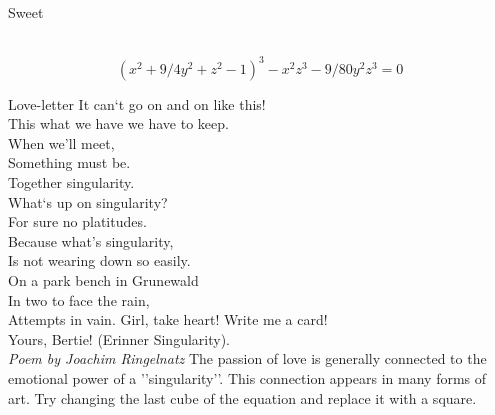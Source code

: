 \documentclass[no]{./../../common/SurferDesc}%
\begin{document}
\footnotesize


\begin{surferPage}
  \begin{surferTitle}Sweet\end{surferTitle}   \\

\smallskip
\[(x^2+ 9/4y^2	+ z^2- 1)^3- x^2z^3	- 9/80y^2z^3	= 0\]

\singlespacing
Love-letter
\singlespacing
It can`t go on and on like this!\\
This what we have we have to keep.\\
When we'll meet,\\
Something must be.\\
Together singularity.\\
What`s up on singularity?\\
For sure no platitudes.\\
Because what's singularity,\\
Is not wearing down so easily.\\
On a park bench in Grunewald\\
In two to face the rain,\\
Attempts in vain. Girl, take heart! Write me a card!\\
Yours, Bertie! (Erinner Singularity).\\
{\it Poem by Joachim Ringelnatz}
\singlespacing 
The passion of love is generally connected to the emotional power of a ''singularity''. This connection appears in many forms of art.
\singlespacing 
Try changing the last cube of the equation and replace it with a square.



  \begin{surferText}
     \end{surferText}
\end{surferPage}
\end{document}
